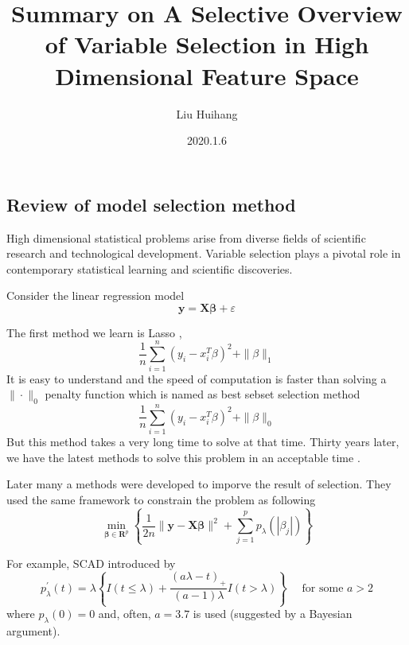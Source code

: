 \documentclass[]{article}
\title{Summary on A Selective Overview of Variable Selection in High
Dimensional Feature Space}
\author{Liu Huihang}
\date{2020.1.6}
\begin{document}
\maketitle

\hypertarget{review-of-model-selection-method}{%
\subsection{Review of model selection
method}\label{review-of-model-selection-method}}

High dimensional statistical problems arise from diverse fields of
scientific research and technological development. Variable selection
plays a pivotal role in contemporary statistical learning and scientific
discoveries.

Consider the linear regression model \begin{equation}
\mathbf{y}=\mathbf{X} \boldsymbol{\beta}+\varepsilon
\end{equation}

The first method we learn is Lasso \citet{tibshirani1996regression},
\begin{equation}
  \frac{1}{n} \sum_{i=1}^n \left( y_i - x_i^T \beta \right)^2 + \| \beta \|_1
\end{equation} It is easy to understand and the speed of computation is
faster than solving a \(\|\cdot\|_0\) penalty function which is named as
best sebset selection method \begin{equation}
  \frac{1}{n} \sum_{i=1}^n \left( y_i - x_i^T \beta \right)^2 + \| \beta \|_0
\end{equation} But this method takes a very long time to solve at that
time. Thirty years later, we have the latest methods to solve this
problem in an acceptable time \citet{wen2017bess}.

Later many a methods were developed to imporve the result of selection.
They used the same framework to constrain the problem as following
\begin{equation}
  \min _{\boldsymbol{\beta} \in \mathbf{R}^{p}}\left\{\frac{1}{2 n}\|\mathbf{y}-\mathbf{X} \boldsymbol{\beta}\|^{2}+\sum_{j=1}^{p} p_{\lambda}\left(\left|\beta_{j}\right|\right)\right\}
\end{equation}

For example, SCAD introduced by \citet{fan2001variable} \begin{equation}
  p_{\lambda}^{\prime}(t)=\lambda\left\{I(t \leq \lambda)+\frac{(a \lambda-t)_{+}}{(a-1) \lambda} I(t>\lambda)\right\} \quad \text { for some } a>2
\end{equation} where \(p_{\lambda}(0) = 0\) and, often, \(a = 3.7\) is
used (suggested by a Bayesian argument).
\end{document}
